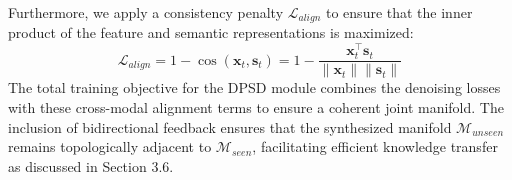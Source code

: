 Furthermore, we apply a consistency penalty $\mathcal{L}_{align}$ to ensure that the inner product of the feature and semantic representations is maximized:
\begin{equation}
\mathcal{L}_{align} = 1 - \cos(\mathbf{x}_t, \mathbf{s}_t) = 1 - \frac{\mathbf{x}_t^\top \mathbf{s}_t}{\|\mathbf{x}_t\| \|\mathbf{s}_t\|}
\end{equation}
The total training objective for the DPSD module combines the denoising losses with these cross-modal alignment terms to ensure a coherent joint manifold. The inclusion of bidirectional feedback ensures that the synthesized manifold $\mathcal{M}_{unseen}$ remains topologically adjacent to $\mathcal{M}_{seen}$, facilitating efficient knowledge transfer as discussed in Section 3.6.
